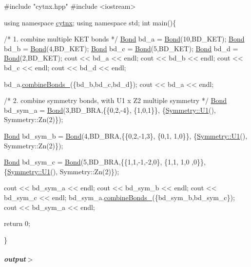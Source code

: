 \begin{DoxyCodeInclude}
\textcolor{preprocessor}{#include "cytnx.hpp"}
\textcolor{preprocessor}{#include <iostream>}


\textcolor{keyword}{using namespace }\hyperlink{namespacecytnx}{cytnx};
\textcolor{keyword}{using namespace }std;
\textcolor{keywordtype}{int} main()\{ 

    \textcolor{comment}{/* 1.}
\textcolor{comment}{        combine multiple KET bonds}
\textcolor{comment}{    */}
    \hyperlink{classcytnx_1_1Bond}{Bond} bd\_a = \hyperlink{classcytnx_1_1Bond}{Bond}(10,BD\_KET);
    \hyperlink{classcytnx_1_1Bond}{Bond} bd\_b = \hyperlink{classcytnx_1_1Bond}{Bond}(4,BD\_KET);
    \hyperlink{classcytnx_1_1Bond}{Bond} bd\_c = \hyperlink{classcytnx_1_1Bond}{Bond}(5,BD\_KET);
    \hyperlink{classcytnx_1_1Bond}{Bond} bd\_d = \hyperlink{classcytnx_1_1Bond}{Bond}(2,BD\_KET);
    cout << bd\_a << endl;
    cout << bd\_b << endl;
    cout << bd\_c << endl;   
    cout << bd\_d << endl;
    
    bd\_a.\hyperlink{classcytnx_1_1Bond_a1fd655bfe0845839502b6e385d743078}{combineBonds\_}(\{bd\_b,bd\_c,bd\_d\});
    cout << bd\_a << endl;


    \textcolor{comment}{/* 2.}
\textcolor{comment}{        combine symmetry bonds, }
\textcolor{comment}{        with U1 x Z2 multiple symmetry }
\textcolor{comment}{    */}
    \hyperlink{classcytnx_1_1Bond}{Bond} bd\_sym\_a = \hyperlink{classcytnx_1_1Bond}{Bond}(3,BD\_BRA,\{\{0,2,-4\},
                               \{1,0,1\}\},
                              \{\hyperlink{classcytnx_1_1Symmetry_a9218fd66fc9cca64cd3d792e0019592a}{Symmetry::U1}(),
                               Symmetry::Zn(2)\});
                                
    \hyperlink{classcytnx_1_1Bond}{Bond} bd\_sym\_b = \hyperlink{classcytnx_1_1Bond}{Bond}(4,BD\_BRA,\{\{0,2,-1,3\},
                               \{0,1, 1,0\}\},
                              \{\hyperlink{classcytnx_1_1Symmetry_a9218fd66fc9cca64cd3d792e0019592a}{Symmetry::U1}(),
                               Symmetry::Zn(2)\});

    \hyperlink{classcytnx_1_1Bond}{Bond} bd\_sym\_c = \hyperlink{classcytnx_1_1Bond}{Bond}(5,BD\_BRA,\{\{1,1,-1,-2,0\},
                               \{1,1, 1,0 ,0\}\},
                              \{\hyperlink{classcytnx_1_1Symmetry_a9218fd66fc9cca64cd3d792e0019592a}{Symmetry::U1}(),
                               Symmetry::Zn(2)\});
    
    cout << bd\_sym\_a << endl;
    cout << bd\_sym\_b << endl;
    cout << bd\_sym\_c << endl;
    bd\_sym\_a.\hyperlink{classcytnx_1_1Bond_a1fd655bfe0845839502b6e385d743078}{combineBonds\_}(\{bd\_sym\_b,bd\_sym\_c\});
    cout << bd\_sym\_a << endl;

    \textcolor{keywordflow}{return} 0;
    


\}

\end{DoxyCodeInclude}
 \subparagraph*{output$>$}


